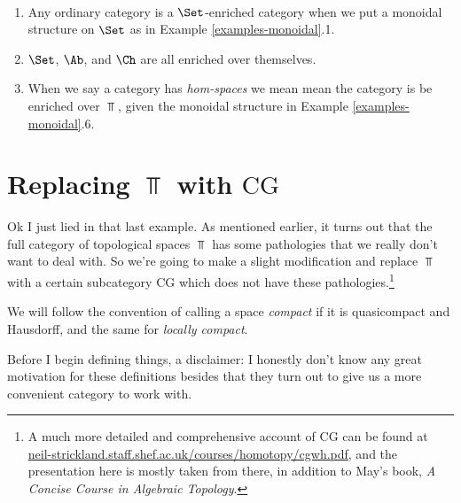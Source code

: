 \begin{examples}
  \ \begin{enumerate}
  \item Any ordinary category is a $\Set$-enriched category when we
    put a monoidal structure on $\Set$ as in Example
    \ref{examples-monoidal}.1.
  \item $\Set$, $\Ab$, and $\Ch$ are all enriched over themselves.
  \item When we say a category has \textit{hom-spaces} we mean mean
    the category is be enriched over $\Top$, given the monoidal
    structure in Example \ref{examples-monoidal}.6.
  \end{enumerate}
\end{examples}


\newcommand{\CG}{\mathrm{CG}}
\newcommand{\WH}{\mathrm{WH}}

\section{Replacing $\Top$ with $\CG$}

Ok I just lied in that last example. As mentioned earlier, it turns
out that the full category of topological spaces $\Top$ has some
pathologies that we really don't want to deal with. So we're going to
make a slight modification and replace $\Top$ with a certain
subcategory $\CG$ which does not have these pathologies.\footnote{A
  much more detailed and comprehensive account of $\CG$ can be found
  at \url{neil-strickland.staff.shef.ac.uk/courses/homotopy/cgwh.pdf},
  and the presentation here is mostly taken from there, in addition to
  May's book, \textit{A Concise Course in Algebraic Topology}.}

\begin{convention}
  We will follow the convention of calling a space \textit{compact} if
  it is quasicompact and Hausdorff, and the same for \textit{locally
    compact}.
\end{convention}

Before I begin defining things, a disclaimer: I honestly don't know
any great motivation for these definitions besides that they turn out
to give us a more convenient category to work with.

